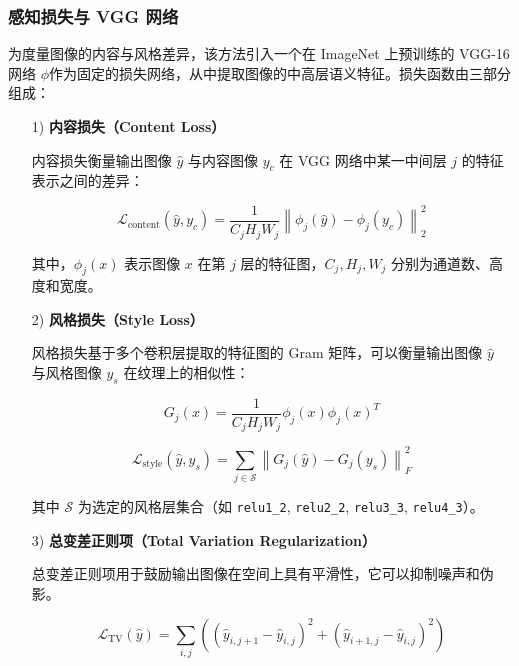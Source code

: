 \documentclass{article}
\begin{document}
\subsubsection{感知损失与 VGG 网络}

为度量图像的内容与风格差异，该方法引入一个在 ImageNet\cite{deng2009imagenet} 上预训练的 VGG-16 网络\cite{simonyan2014very} $\phi$作为固定的损失网络，从中提取图像的中高层语义特征。损失函数由三部分组成：

\begin{enumerate}
    \item[1)] \textbf{内容损失（Content Loss）}
    
    内容损失衡量输出图像 $\hat{y}$ 与内容图像 $y_c$ 在 VGG 网络中某一中间层 $j$ 的特征表示之间的差异：

    \begin{equation}
    \mathcal{L}_{\text{content}}(\hat{y}, y_c) = \frac{1}{C_j H_j W_j} \left\| \phi_j(\hat{y}) - \phi_j(y_c) \right\|_2^2
    \end{equation}

    其中，$\phi_j(x)$ 表示图像 $x$ 在第 $j$ 层的特征图，$C_j, H_j, W_j$ 分别为通道数、高度和宽度。

\item[2)] \textbf{风格损失（Style Loss）}  

风格损失基于多个卷积层提取的特征图的 Gram 矩阵，可以衡量输出图像 $\hat{y}$ 与风格图像 $y_s$ 在纹理上的相似性：

\begin{equation}
G_j(x) = \frac{1}{C_j H_j W_j} \phi_j(x) \phi_j(x)^T
\end{equation}

\begin{equation}
\mathcal{L}_{\text{style}}(\hat{y}, y_s) = \sum_{j \in \mathcal{S}} \left\| G_j(\hat{y}) - G_j(y_s) \right\|_F^2
\end{equation}

其中 $\mathcal{S}$ 为选定的风格层集合（如 \texttt{relu1\_2}, \texttt{relu2\_2}, \texttt{relu3\_3}, \texttt{relu4\_3}）。

\item[3)] \textbf{总变差正则项（Total Variation Regularization）} 

总变差正则项用于鼓励输出图像在空间上具有平滑性，它可以抑制噪声和伪影。

\begin{equation}
\mathcal{L}_{\text{TV}}(\hat{y}) = \sum_{i,j} \left( (\hat{y}_{i,j+1} - \hat{y}_{i,j})^2 + (\hat{y}_{i+1,j} - \hat{y}_{i,j})^2 \right)
\end{equation}
\end{enumerate}
\end{document}
